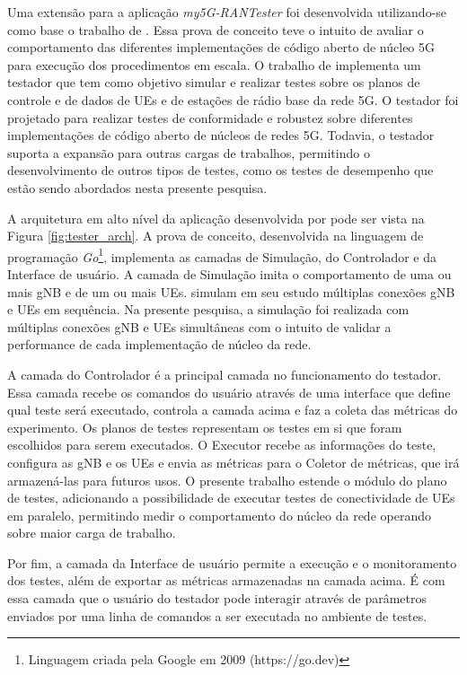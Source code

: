 Uma extensão para a aplicação \textit{my5G-RANTester} foi desenvolvida utilizando-se como base o trabalho de .
Essa prova de conceito teve o intuito de avaliar o comportamento das diferentes implementações de código aberto de núcleo 5G para execução dos procedimentos em escala.
O trabalho de  implementa um testador que tem como objetivo simular e realizar testes sobre os planos de controle e de dados de UEs e de estações de rádio base da rede 5G.
O testador foi projetado para realizar testes de conformidade e robustez sobre diferentes implementações de código aberto de núcleos de redes 5G.
Todavia, o testador suporta a expansão para outras cargas de trabalhos, permitindo o desenvolvimento de outros tipos de testes, como os testes de desempenho que estão sendo abordados nesta presente pesquisa.

A arquitetura em alto nível da aplicação desenvolvida por  pode ser vista na Figura \ref{fig:tester_arch}.
A prova de conceito, desenvolvida na linguagem de programação \textit{Go}\footnote{Linguagem criada pela Google em 2009 (https://go.dev)}, implementa as camadas de Simulação, do Controlador e da Interface de usuário.
A camada de Simulação imita o comportamento de uma ou mais gNB e de um ou mais UEs.
 simulam em seu estudo múltiplas conexões gNB e UEs em sequência. Na presente pesquisa, a simulação foi realizada com múltiplas conexões gNB e UEs simultâneas com o intuito de validar a performance de cada implementação de núcleo da rede.

A camada do Controlador é a principal camada no funcionamento do testador. Essa camada recebe os comandos do usuário através de uma interface que define qual teste será executado, controla a camada acima e faz a coleta das métricas do experimento.
Os planos de testes representam os testes em si que foram escolhidos para serem executados. O Executor recebe as informações do teste, configura as gNB e os UEs e envia as métricas para o Coletor de métricas, que irá armazená-las para futuros usos.
O presente trabalho estende o módulo do plano de testes, adicionando a possibilidade de executar testes de conectividade de UEs em paralelo, permitindo medir o comportamento do núcleo da rede operando sobre maior carga de trabalho.

Por fim, a camada da Interface de usuário permite a execução e o monitoramento dos testes, além de exportar as métricas armazenadas na camada acima. É com essa camada que o usuário do testador pode interagir através de parâmetros enviados por uma linha de comandos a ser executada no ambiente de testes.


